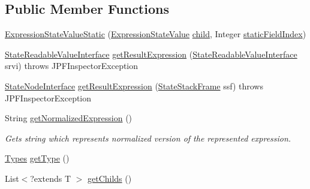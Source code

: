 \subsection*{Public Member Functions}
\begin{DoxyCompactItemize}
\item 
\hyperlink{classgov_1_1nasa_1_1jpf_1_1inspector_1_1server_1_1expression_1_1expressions_1_1_expression_state_value_static_aabd0e7aa1b784f62b4f1b722a6c9f2f8}{Expression\+State\+Value\+Static} (\hyperlink{classgov_1_1nasa_1_1jpf_1_1inspector_1_1server_1_1expression_1_1expressions_1_1_expression_state_value}{Expression\+State\+Value} \hyperlink{classgov_1_1nasa_1_1jpf_1_1inspector_1_1server_1_1expression_1_1_expression_state_unary_operator_a66041b1f569a361549e28a00f7ca5f2f}{child}, Integer \hyperlink{classgov_1_1nasa_1_1jpf_1_1inspector_1_1server_1_1expression_1_1expressions_1_1_expression_state_value_static_a0503b428cc99f4f62e2abcc84635dc23}{static\+Field\+Index})
\item 
\hyperlink{interfacegov_1_1nasa_1_1jpf_1_1inspector_1_1server_1_1programstate_1_1_state_readable_value_interface}{State\+Readable\+Value\+Interface} \hyperlink{classgov_1_1nasa_1_1jpf_1_1inspector_1_1server_1_1expression_1_1expressions_1_1_expression_state_value_static_a9bac827a01f14aec07a158a71cbdd68b}{get\+Result\+Expression} (\hyperlink{interfacegov_1_1nasa_1_1jpf_1_1inspector_1_1server_1_1programstate_1_1_state_readable_value_interface}{State\+Readable\+Value\+Interface} srvi)  throws J\+P\+F\+Inspector\+Exception 
\item 
\hyperlink{interfacegov_1_1nasa_1_1jpf_1_1inspector_1_1server_1_1programstate_1_1_state_node_interface}{State\+Node\+Interface} \hyperlink{classgov_1_1nasa_1_1jpf_1_1inspector_1_1server_1_1expression_1_1expressions_1_1_expression_state_value_static_a1ed944928681ef8c6effc4b47820ec00}{get\+Result\+Expression} (\hyperlink{classgov_1_1nasa_1_1jpf_1_1inspector_1_1server_1_1programstate_1_1_state_stack_frame}{State\+Stack\+Frame} ssf)  throws J\+P\+F\+Inspector\+Exception 
\item 
String \hyperlink{classgov_1_1nasa_1_1jpf_1_1inspector_1_1server_1_1expression_1_1expressions_1_1_expression_state_value_static_ac8bdf9d1b21b32d12a6e6e5279cc70a6}{get\+Normalized\+Expression} ()
\begin{DoxyCompactList}\small\item\em Gets string which represents normalized version of the represented expression. \end{DoxyCompactList}\item 
\hyperlink{enumgov_1_1nasa_1_1jpf_1_1inspector_1_1server_1_1expression_1_1_types}{Types} \hyperlink{classgov_1_1nasa_1_1jpf_1_1inspector_1_1server_1_1expression_1_1expressions_1_1_expression_state_value_a9317f49f60c166a2f46f90702e75f22e}{get\+Type} ()
\item 
List$<$?extends T $>$ \hyperlink{classgov_1_1nasa_1_1jpf_1_1inspector_1_1server_1_1expression_1_1_expression_state_unary_operator_ad010bcb9c4e2eb584321b5ceba8e1682}{get\+Childs} ()
\end{DoxyCompactItemize}
